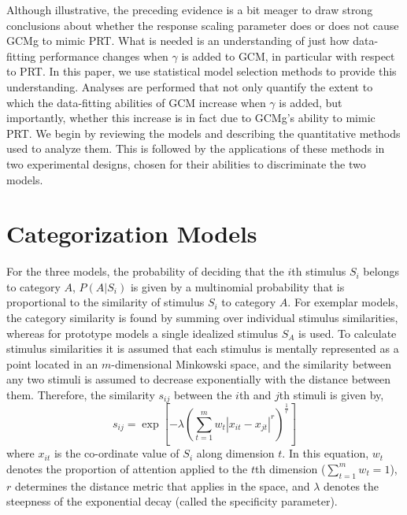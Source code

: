 \documentclass[11pt]{article}
\begin{document}
Although illustrative, the preceding evidence is a bit meager to draw strong conclusions about
whether the response scaling parameter does or does not cause GCMg to mimic PRT. What is needed is
an understanding of just how data-fitting performance changes when $\gamma$ is added to GCM, in
particular with respect to PRT. In this paper, we use statistical model selection methods to
provide this understanding. Analyses are performed that not only quantify the extent to which the
data-fitting abilities of GCM increase when $\gamma$ is added, but importantly, whether this
increase is in fact due to GCMg's ability to mimic PRT. We begin by reviewing the models and
describing the quantitative methods used to analyze them. This is followed by the applications of
these methods in two experimental designs, chosen for their abilities to discriminate the two models.


\section{Categorization Models}


For the three models, the probability of deciding that the $i$th stimulus $S_i$ belongs to
category $A$, $P(A|S_{i})$ is given by a multinomial probability that is proportional to the
similarity of stimulus $S_i$ to category $A$. For exemplar models, the category similarity is
found by summing over individual stimulus similarities, whereas for prototype models a single
idealized stimulus $S_A$ is used. To calculate stimulus similarities it is assumed that each
stimulus is mentally represented as a point located in an $m$-dimensional Minkowski space, and the
similarity between any two stimuli is assumed to decrease exponentially with the distance between
them. Therefore, the similarity $s_{ij}$ between the $i$th and $j$th stimuli is given by,
\begin{equation}\label{similarity}
s_{ij} = \exp \left[ -\lambda \left( \sum_{t=1}^{m} w_t | x_{it} - x_{jt} |^{r}
\right)^\frac{1}{r} \right]
\end{equation}
where $x_{it}$ is the co-ordinate value of $S_i$ along dimension $t$. In this equation, $w_t$
denotes the proportion of attention applied to the $t$th dimension ($\sum_{t=1}^m w_t =1$), $r$
determines the distance metric that applies in the space, and $\lambda$ denotes the steepness of
the exponential decay (called the specificity parameter).
\end{document}
